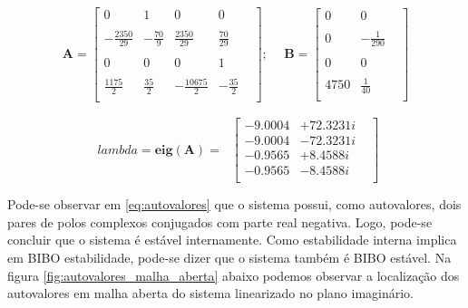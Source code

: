 \documentclass[a4paper]{ifacconf}
\begin{document}
    \begin{equation}
    \begin{split}
    \mathbf{A} =
        \begin{bmatrix}
               0&      1&        0&     0&\\ \\
               -\frac{2350}{29}& -\frac{70}{9}&  \frac{2350}{29}& \frac{70}{29}&\\ \\
               0&      0&        0&     1&\\ \\
                \frac{1175}{2}&   \frac{35}{2}& -\frac{10675}{2}& -\frac{35}{2}&\\ 
        \end{bmatrix}; \ \
    \end{split}
   \begin{split}
   \mathbf{B} =
        \begin{bmatrix}
               0&      0&\\ \\
               0& -\frac{1}{290}&\\ \\
               0&      0&\\ \\
            4750&   \frac{1}{40}&\\
        \end{bmatrix}
   \end{split}     
    \end{equation}
    
    \begin{equation} \label{eq:autovalores}
        \begin{split}
             lambda=\mathbf{eig(A)}=\
        \end{split}
        \begin{bmatrix}
            -9.0004& +72.3231i&\\
            -9.0004& -72.3231i&\\
            -0.9565& + 8.4588i&\\
            -0.9565& - 8.4588i&\\
        \end{bmatrix}
    \end{equation}
        
    Pode-se observar em \ref {eq:autovalores} que o sistema possui, como autovalores, dois pares de polos complexos conjugados com parte real negativa. Logo, pode-se concluir que o sistema é estável internamente. Como estabilidade interna implica em BIBO estabilidade, pode-se dizer que o sistema também é BIBO estável.
    Na figura \ref{fig:autovalores_malha_aberta} abaixo podemos observar a localização dos autovalores em malha aberta do sistema linearizado no plano imaginário.
    
\end{document}
